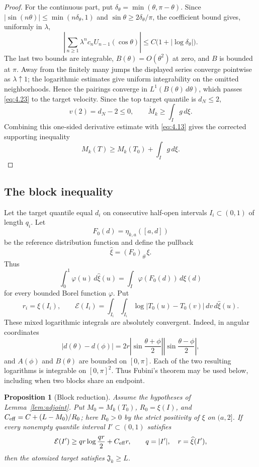 \documentclass[11pt]{article}
\numberwithin{equation}{section}
\theoremstyle{plain}
\newtheorem{proposition}[theorem]{Proposition}
\theoremstyle{definition}
\theoremstyle{remark}
\newcommand{\1}{\mathbf 1}
\newcommand{\dd}{\,d}
\newcommand{\J}{\mathfrak J}
\newcommand{\E}{\mathcal E}
\begin{document}
\begin{proof}
For the continuous part, put
$\delta_\theta=\min(\theta,\pi-\theta)$.  Since
$|\sin(n\theta)|\le\min(n\delta_\theta,1)$ and
$\sin\theta\ge2\delta_\theta/\pi$, the coefficient bound gives, uniformly
in $\lambda$,
\[
 \left|\sum_{n\ge1}\lambda^nc_nU_{n-1}(\cos\theta)\right|
 \le C\bigl(1+|\log\delta_\theta|\bigr).
\]
The last two bounds are integrable, $B(\theta)=O(\theta^2)$ at zero, and
$B$ is bounded at $\pi$.  Away from the finitely many jumps the displayed
series converge pointwise as $\lambda\uparrow1$; the logarithmic estimates
give uniform integrability on the omitted neighborhoods.  Hence the
pairings converge in $L^1(B(\theta)\dd\theta)$, which passes \eqref{eq:4.23} to the
target velocity.
Since the
top target quantile is $d_N\le2$,
\[
 v(2)=d_N-2\le0,\qquad
 \dot M_k\ge\int_Ig\dd\xi.
\]
Combining this one-sided derivative estimate with \eqref{eq:4.13} gives the corrected supporting inequality
\begin{equation}
 M_k(T)\ge M_k(T_0)+\int_Ig\dd\xi.
\label{eq:4.25}
\end{equation}
\end{proof}

\subsection{The block inequality}

Let the target quantile equal $d_i$ on consecutive half-open intervals
$I_i\subset(0,1)$ of length $q_i$.  Let
\[
 F_0(d)=\eta_{k,a}([a,d])
\]
be the reference distribution function and define the pullback
\[
 \widehat\xi=(F_0)_\#\xi.
\]
Thus
\[
 \int_0^1\varphi(u)\dd\widehat\xi(u)
 =\int_I\varphi(F_0(d))\dd\xi(d)
\]
for every bounded Borel function $\varphi$.  Put
\begin{equation}
 r_i=\widehat\xi(I_i),\qquad
 \E(I_i)=\int_{I_i}\int_{I_i}
 \log|T_0(u)-T_0(v)|\dd v\dd\widehat\xi(u).
\label{eq:4.26}
\end{equation}
These mixed logarithmic integrals are absolutely convergent.  Indeed, in
angular coordinates
\[
 |d(\theta)-d(\phi)|
 =2r\left|\sin\frac{\theta+\phi}{2}\right|
       \left|\sin\frac{\theta-\phi}{2}\right|,
\]
and $A(\phi)$ and $B(\theta)$ are bounded on $[0,\pi]$.  Each of the two
resulting logarithms is integrable on $[0,\pi]^2$.  Thus Fubini's theorem
may be used below, including when two blocks share an endpoint.

\begin{proposition}[Block reduction]\label{prop:block}
Assume the hypotheses of Lemma~\ref{lem:adjoint}.  Put
$M_0=M_k(T_0)$, $R_0=\xi(I)$, and
$C_{\rm eff}=C+(L-M_0)/R_0$; here $R_0>0$ by the strict positivity of
$\xi$ on $(a,2]$.  If every nonempty quantile interval
$I'\subset(0,1)$ satisfies
\[
 \E(I')\ge qr\log\frac{qr}{2}+C_{\rm eff}r,
 \qquad q=|I'|,\quad r=\widehat\xi(I'),
\]
then the atomized target satisfies $\J_k\ge L$.
\end{proposition}
\end{document}

